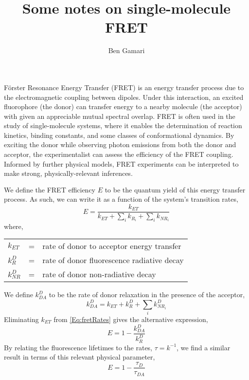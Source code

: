 \documentclass{article}
\title{Some notes on single-molecule FRET}
\author{Ben Gamari}
\newcommand{\NR}{\ensuremath{\mathit{NR}}}          %
\newcommand{\ET}{\ensuremath{\mathit{ET}}}          %
\begin{document}
\maketitle

F\"orster Resonance Energy Transfer (FRET) is an energy transfer
process due to the electromagnetic coupling between dipoles. Under
this interaction, an excited fluorophore (the donor) can transfer energy
to a nearby molecule (the acceptor) with given an appreciable mutual
spectral overlap. FRET is often used in the study of single-molecule
systems, where it enables the determination of reaction kinetics,
binding constants, and some classes of conformational dynamics.
By exciting the donor while observing photon emissions from both the
donor and acceptor, the experimentalist can assess the efficiency of
the FRET coupling. Informed by further physical models, FRET
experiments can be interpreted to make strong, physically-relevant
inferences.

We define the FRET efficiency $E$ to be the quantum yield of this
energy transfer process. As such, we can write it as a function of the
system's transition rates,
\begin{equation}
  E = \frac{k_\ET}{k_\ET + \sum_i k_{R_i} + \sum_i k_{\NR_i}}
  \label{Eq:fretRates}
\end{equation}
where,

\begin{tabular}{lcl}
  $k_\ET$     & = & rate of donor to acceptor energy transfer \\
  $k^D_R$     & = & rate of donor fluorescence radiative decay \\
  $k^D_\NR$   & = & rate of donor non-radiative decay \\
\end{tabular}

We define $k^D_{DA}$ to be the rate of donor relaxation in the presence
of the acceptor,
\[ k^D_{DA} = k_\ET + k^D_R + \sum_i k^D_{\NR_i} \]
Eliminating $k_\ET$ from \eqref{Eq:fretRates} gives the alternative expression,
\begin{equation}
  E = 1 - \frac{k^D_{DA}}{k^D_R} \label{Eq:fretEffRates}
\end{equation}
By relating the fluorescence lifetimes to the rates, $\tau = k^{-1}$,
we find a similar result in terms of this relevant physical parameter,
\begin{equation}
  E = 1 - \frac{\tau_D}{\tau_{DA}} \label{Eq:fretEffTau}
\end{equation}
\end{document}
